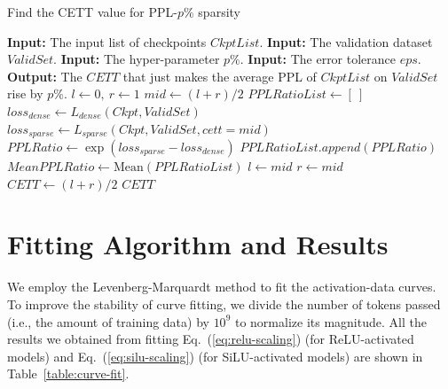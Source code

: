 \documentclass{article} %
\begin{document}
\begin{algorithm}[ht]

\begin{minipage}[r]{\linewidth}

\caption{Find the CETT value for PPL-$p\%$ sparsity}
\label{algorithm:binary-search}
\begin{algorithmic}
\STATE \textbf{Input:}  The input list of checkpoints $CkptList$.
\STATE \textbf{Input:}  The validation dataset $ValidSet$.
\STATE \textbf{Input:}  The hyper-parameter $p\%$.
\STATE \textbf{Input:}  The error tolerance $eps$.
\STATE \textbf{Output:} The $CETT$ that just makes the average PPL of $CkptList$ on $ValidSet$ rise by $p\%$.
\STATE $l \gets 0,\ r \gets 1$
    \STATE $mid \gets (l+r)/2$
    \STATE $PPLRatioList \gets [\ ]$
        \STATE $loss_{dense} \gets L_{dense}(Ckpt, ValidSet)$
        \STATE $loss_{sparse} \gets L_{sparse}(Ckpt, ValidSet, cett=mid)$
        \STATE $PPLRatio \gets \exp(loss_{sparse} - loss_{dense})$
        \STATE $PPLRatioList.append(PPLRatio)$
    \ENDFOR
    \STATE $MeanPPLRatio \gets \mathrm{Mean}(PPLRatioList)$
        \STATE $l \gets mid$
    \ELSE
        \STATE $r \gets mid$
    \ENDIF
\ENDWHILE
\STATE $CETT \gets (l+r)/2$
\RETURN $CETT$
\end{algorithmic}

\end{minipage}
\end{algorithm}



\section{Fitting Algorithm and Results} \label{sec:fitting-alg}

We employ the Levenberg-Marquardt method \citep{marquardt1963algorithm} to fit the activation-data curves. To improve the stability of curve fitting, we divide the number of tokens passed (i.e., the amount of training data) by $10^9$ to normalize its magnitude.
All the results we obtained from fitting Eq.~(\ref{eq:relu-scaling}) (for ReLU-activated models) and Eq.~(\ref{eq:silu-scaling}) (for SiLU-activated models) are shown in Table~\ref{table:curve-fit}.
\end{document}
